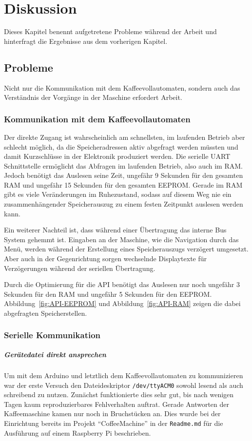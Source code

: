\chapter{Diskussion}\label{ch:Diskussion}
Dieses Kapitel benennt aufgetretene Probleme während der Arbeit und hinterfragt die Ergebnisse aus dem vorherigen Kapitel.

\section{Probleme}
Nicht nur die Kommunikation mit dem Kaffeevollautomaten, sondern auch das Verständnis der Vorgänge in der Maschine erfordert Arbeit.

\subsection{Kommunikation mit dem Kaffeevollautomaten} \label{subsec:zugangSeriellDirekt}
Der direkte Zugang ist wahrscheinlich am schnellsten, im laufenden Betrieb aber schlecht möglich, da die Speicheradressen aktiv abgefragt werden müssten und damit Kurzschlüsse in der Elektronik produziert werden.
Die serielle \ac{UART} Schnittstelle ermöglicht das Abfragen im laufenden Betrieb, also auch im \ac{RAM}.
Jedoch benötigt das Auslesen seine Zeit, ungefähr 9 Sekunden für den gesamten \ac{RAM} und ungefähr 15 Sekunden für den gesamten \ac{EEPROM}.
Gerade im \ac{RAM} gibt es viele Veränderungen im Ruhezustand, sodass auf diesem Weg nie ein zusammenhängender Speicherauszug zu einem festen Zeitpunkt auslesen werden kann.

Ein weiterer Nachteil ist, dass während einer Übertragung das interne Bus System gehemmt ist.
Eingaben an der Maschine, wie die Navigation durch das Menü, werden während der Erstellung eines Speicherauszugs verzögert umgesetzt.
Aber auch in der Gegenrichtung sorgen wechselnde Displaytexte für Verzögerungen während der seriellen Übertragung.

Durch die Optimierung für die \ac{API} benötigt das Auslesen nur noch ungefähr 3 Sekunden für den \ac{RAM} und ungefähr 5 Sekunden für den \ac{EEPROM}.
Abbildung~\ref{fig:API-EEPROM} und Abbildung~\ref{fig:API-RAM} zeigen die dabei abgefragten Speicherstellen.

\subsection{Serielle Kommunikation} \label{subsec:kommunikationGeraetedateiLibserialLibrary}
\paragraph{Gerätedatei direkt ansprechen}
Um mit dem Arduino und letztlich dem Kaffeevollautomaten zu kommunizieren war der erste Versuch den Dateideskriptor \texttt{/dev/ttyACM0} sowohl lesend als auch schreibend zu nutzen.
Zunächst funktionierte dies sehr gut, bis nach wenigen Tagen kaum reproduzierbares Fehlverhalten auftrat.
Gerade Antworten der Kaffeemaschine kamen nur noch in Bruchstücken an.
Dies wurde bei der Einrichtung bereits im Projekt "`CoffeeMachine"'\cite{GitCoffeeMachine} in der \texttt{Readme.md} für die Ausführung auf einem Raspberry Pi beschrieben.

